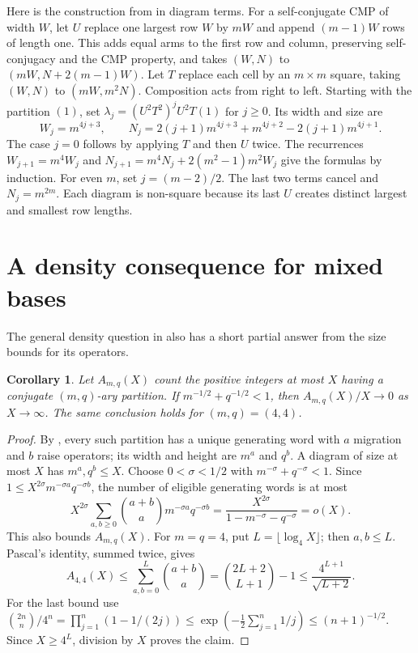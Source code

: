 \documentclass[11pt]{article}
\newtheorem{corollary}[theorem]{Corollary}
\begin{document}
Here is the construction from \cite[Corollary~5.9, p.~404]{DFL}
in diagram terms. For a self-conjugate CMP of width $W$, let $U$
replace one largest row $W$ by $mW$ and append $(m-1)W$ rows of
length one. This adds equal arms to the first row and column,
preserving self-conjugacy and the CMP property, and takes
$(W,N)$ to $(mW,N+2(m-1)W)$.
Let $T$ replace each cell by an $m\times m$ square, taking
$(W,N)$ to $(mW,m^2N)$. Composition acts from right to left.
Starting with the partition $(1)$, set
$\lambda_j=(U^2T^2)^jU^2T(1)$ for $j\geq0$.
Its width and size are
\[
 W_j=m^{4j+3},\qquad
 N_j=2(j+1)m^{4j+3}+m^{4j+2}-2(j+1)m^{4j+1}.
\]
The case $j=0$ follows by applying $T$ and then $U$ twice.
The recurrences $W_{j+1}=m^4W_j$ and
$N_{j+1}=m^4N_j+2(m^2-1)m^2W_j$ give the formulas by induction.
For even $m$, set $j=(m-2)/2$. The last two terms cancel and
$N_j=m^{2m}$. Each diagram is non-square because its last $U$
creates distinct largest and smallest row lengths.

\section{A density consequence for mixed bases}
The general density question in \cite[Question~4.9, p.~400]{DFL}
also has a short partial answer from the size bounds for its operators.
\begin{corollary}\label{cor:density}
Let $A_{m,q}(X)$ count the positive integers at most $X$ having a
conjugate $(m,q)$-ary partition. If
$m^{-1/2}+q^{-1/2}<1$, then $A_{m,q}(X)/X\to0$ as $X\to\infty$.
The same conclusion holds for $(m,q)=(4,4)$.
\end{corollary}
\begin{proof}
By \cite[Theorem~2.7 and Corollary~2.9]{DFL}, every such partition
has a unique generating word with $a$ migration and $b$ raise operators;
its width and height are $m^a$ and $q^b$.
A diagram of size at most $X$ has $m^a,q^b\leq X$.
Choose $0<\sigma<1/2$ with $m^{-\sigma}+q^{-\sigma}<1$.
Since $1\leq X^{2\sigma}m^{-\sigma a}q^{-\sigma b}$,
the number of eligible generating words is at most
\[
 X^{2\sigma}\sum_{a,b\geq0}\binom{a+b}{a}
 m^{-\sigma a}q^{-\sigma b}
 =\frac{X^{2\sigma}}{1-m^{-\sigma}-q^{-\sigma}}=o(X).
\]
This also bounds $A_{m,q}(X)$.
For $m=q=4$, put $L=\lfloor\log_4X\rfloor$; then $a,b\leq L$.
Pascal's identity, summed twice, gives
\[
 A_{4,4}(X)\leq\sum_{a,b=0}^L\binom{a+b}{a}
 =\binom{2L+2}{L+1}-1
 \leq\frac{4^{L+1}}{\sqrt{L+2}}.
\]
For the last bound use
$\binom{2n}{n}/4^n=\prod_{j=1}^n(1-1/(2j))
\leq\exp(-\tfrac12\sum_{j=1}^n1/j)\leq(n+1)^{-1/2}$.
Since $X\geq4^L$, division by $X$ proves the claim.
\end{proof}
\end{document}
